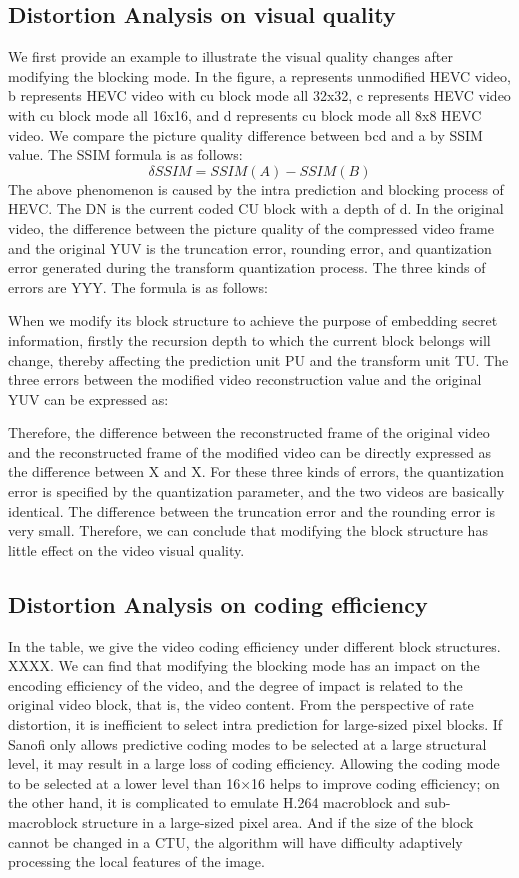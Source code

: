 \documentclass[journal,sort]{IEEEtran}
\begin{document}
\subsection{Distortion Analysis on visual quality}
We first provide an example to illustrate the visual quality changes after modifying the blocking mode. In the figure, a represents unmodified HEVC video, b represents HEVC video with cu block mode all 32x32, c represents HEVC video with cu block mode all 16x16, and d represents cu block mode all 8x8 HEVC video. We compare the picture quality difference between bcd and a by SSIM value. The SSIM formula is as follows:
\begin{equation}
\delta SSIM=SSIM(A)-SSIM(B) 
\end{equation}
The above phenomenon is caused by the intra prediction and blocking process of HEVC. The DN is the current coded CU block with a depth of d. In the original video, the difference between the picture quality of the compressed video frame and the original YUV is the truncation error, rounding error, and quantization error generated during the transform quantization process. The three kinds of errors are YYY. The formula is as follows:

When we modify its block structure to achieve the purpose of embedding secret information, firstly the recursion depth to which the current block belongs will change, thereby affecting the prediction unit PU and the transform unit TU. The three errors between the modified video reconstruction value and the original YUV can be expressed as:

Therefore, the difference between the reconstructed frame of the original video and the reconstructed frame of the modified video can be directly expressed as the difference between X and X. For these three kinds of errors, the quantization error is specified by the quantization parameter, and the two videos are basically identical. The difference between the truncation error and the rounding error is very small. Therefore, we can conclude that modifying the block structure has little effect on the video visual quality.
\subsection{Distortion Analysis on coding efficiency}
In the table, we give the video coding efficiency under different block structures. XXXX. We can find that modifying the blocking mode has an impact on the encoding efficiency of the video, and the degree of impact is related to the original video block, that is, the video content. From the perspective of rate distortion, it is inefficient to select intra prediction for large-sized pixel blocks. If Sanofi only allows predictive coding modes to be selected at a large structural level, it may result in a large loss of coding efficiency. Allowing the coding mode to be selected at a lower level than 16×16 helps to improve coding efficiency; on the other hand, it is complicated to emulate H.264 macroblock and sub-macroblock structure in a large-sized pixel area. And if the size of the block cannot be changed in a CTU, the algorithm will have difficulty adaptively processing the local features of the image.
\end{document}
